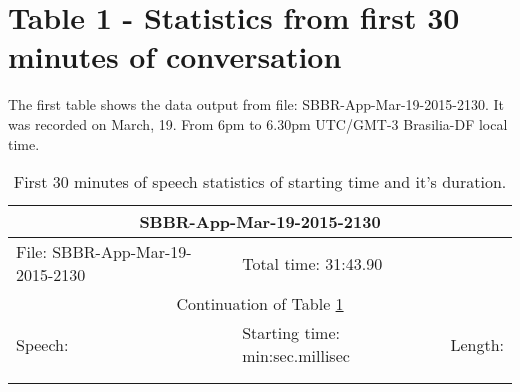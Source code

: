 \documentclass[a4paper,10pt]{report}
\begin{document}
\section{Table 1 - Statistics from first 30 minutes of conversation}
The first table shows the data output from file: SBBR-App-Mar-19-2015-2130. It was recorded on March, 19. From 6pm to 6.30pm UTC/GMT-3 Brasilia-DF local time.
\begin{longtable}[|c|]{|l|l|l|}
  \caption{First 30 minutes of speech statistics of starting time and it's duration.\label{long}}\\

 \hline
 \multicolumn{3}{|c|}{SBBR-App-Mar-19-2015-2130}\\
 \hline
 File: SBBR-App-Mar-19-2015-2130 & Total time: 31:43.90 & ~\\
 \hline
 \endfirsthead
       
 \hline
 \multicolumn{3}{|c|}{Continuation of Table \ref{long}}\\
 \hline
 Speech: & Starting time: min:sec.millisec & Length:\\
 \hline
 \endhead
 
 \hline
 \endfoot
 
 \hline
 \multicolumn{3}{|c|}{End of Table \ref{long}}\\
 \hline
 \endlastfoot
 \hline 
 

\end{longtable}
\end{document}
